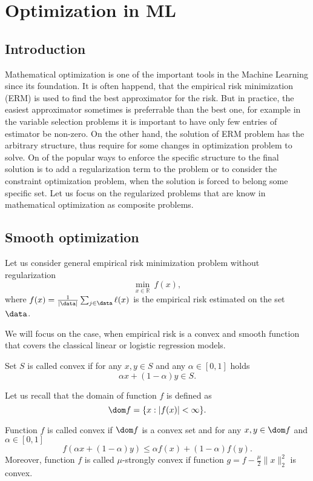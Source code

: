 \section{Optimization in ML}

\subsection{Introduction}
Mathematical optimization is one of the important tools in the Machine Learning since its foundation. It is often happend, that the empirical risk minimization (ERM) is used to find the best approximator for the risk. But in practice, the easiest approximator sometimes is preferrable than the best one, for example in the variable selection problems it is important to have only few entries of estimator be non-zero. On the other hand, the solution of ERM problem has the arbitrary structure, thus require for some changes in optimization problem to solve. On of the popular ways to enforce the specific structure to the final solution is to add a regularization term to the problem or to consider the constraint optimization problem, when the solution is forced to belong some specific set. Let us focus on the regularized problems that are know in mathematical optimization as composite problems.

\subsection{Smooth optimization}

Let us consider general empirical risk minimization problem without regularization
\begin{equation}\label{eq:pb_simple}
\min_{x\in\mathbb{R}}~f(x),
\end{equation}
where $f(x)= \frac{1}{|\data|}  \sum_{j\in\data}\ell(x) $ is the empirical risk estimated on the set $\data$.

We will focus on the case, when empirical risk is a convex and smooth function that covers the classical linear or logistic regression models.


\begin{definition}
Set $S$ is called convex if for any $x,y\in S$ and any $\alpha\in[0,1]$ holds
$$
\alpha x + (1-\alpha)y \in S.
$$
\end{definition}

Let us recall that the domain of function $f$ is defined as
$$
\dom f = \{x:|f(x)|<\infty\}.
$$

\begin{definition}
Function $f$ is called convex if $\dom f$ is a convex set and for any $x, y\in \dom f$ and $\alpha \in[0,1]$
\begin{equation}\label{eq:conv_def}
f(\alpha x + (1-\alpha)y)\leq \alpha f(x) + (1-\alpha)f(y).
\end{equation}
Moreover, function $f$ is called $\mu$-strongly convex if function $g = f - \frac{\mu}{2}\|x\|_2^2$ is convex.
\end{definition}

